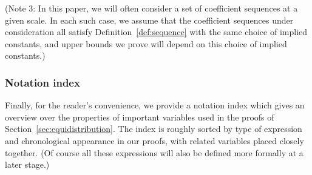 \documentclass{amsart}
\numberwithin{equation}{section}
\begin{document}
(Note 3: In this paper, we will often consider a set of coefficient sequences at a given scale. In each such case, we  assume that the coefficient sequences under consideration all satisfy Definition~\ref{def:sequence} with the same choice of implied constants, and upper bounds we prove  will depend on this choice of implied constants.)

\subsubsection{Notation index}

Finally, for the reader's convenience, we provide a notation index which gives an overview over the properties of important variables used in the proofs of Section~\ref{sec:equidistribution}. The index is roughly sorted by type of  expression and chronological appearance in our proofs, with related variables placed closely together. (Of course all these expressions will also be defined more formally at a later stage.) 
\end{document}
